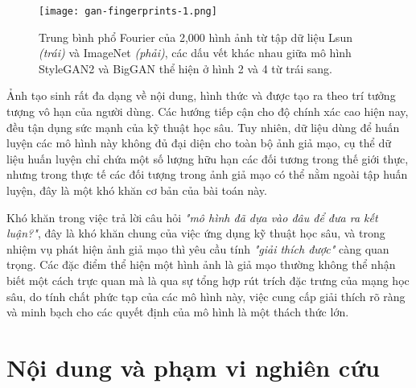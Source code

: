 \begin{itemize}
	\begin{figure}[h]
		\centering
		\texttt{[image: gan-fingerprints-1.png]}
	    \vspace{10pt} %
	    
		\begin{minipage}{\linewidth}
			\caption{Trung bình phổ Fourier của 2,000 hình ảnh từ tập dữ liệu Lsun \textit{(trái)} và ImageNet \textit{(phải)}, các dấu vết khác nhau giữa mô hình StyleGAN2 và BigGAN thể hiện ở hình 2 và 4 từ trái sang.}
			\label{fig:gan-fingerprints-1}
		\end{minipage}
	\end{figure}
\end{itemize}
%
Ảnh tạo sinh rất đa dạng về nội dung, hình thức và được tạo ra theo trí tưởng tượng vô hạn của người dùng. Các hướng tiếp cận cho độ chính xác cao hiện nay, đều tận dụng sức mạnh của kỹ thuật học sâu. Tuy nhiên, dữ liệu dùng để huấn luyện các mô hình này không đủ đại diện cho toàn bộ ảnh giả mạo, cụ thể dữ liệu huấn luyện chỉ chứa một số lượng hữu hạn các đối tương trong thế giới thực, nhưng trong thực tế các đối tượng trong ảnh giả mạo có thể nằm ngoài tập huấn luyện, đây là một khó khăn cơ bản của bài toán này.

Khó khăn trong việc trả lời câu hỏi \textit{"mô hình đã dựa vào đâu để đưa ra kết luận?"}, đây là khó khăn chung của việc ứng dụng kỹ thuật học sâu, và trong nhiệm vụ phát hiện ảnh giả mạo thì yêu cầu tính \textit{"giải thích được"} càng quan trọng. Các đặc điểm thể hiện một hình ảnh là giả mạo thường không thể nhận biết một cách trực quan mà là qua sự tổng hợp rút trích đặc trưng của mạng học sâu, do tính chất phức tạp của các mô hình này, việc cung cấp giải thích rõ ràng và minh bạch cho các quyết định của mô hình là một thách thức lớn.

%
\section{Nội dung và phạm vi nghiên cứu}

